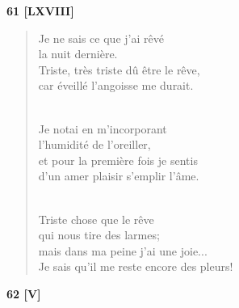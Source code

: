 \documentclass[a4paper,11pt]{book}
\begin{document}
\bigskip

\begin{center} {\bf 61 [LXVIII]} \end{center}

\begin{verse}
Je ne sais ce que j'ai rêvé \\
la nuit dernière. \\
Triste, très triste dû être le rêve, \\
car éveillé l'angoisse me durait. \\ \


Je notai en m'incorporant \\
l'humidité de l'oreiller, \\
et pour la première fois je sentis \\
d'un amer plaisir s'emplir l'âme. \\ \

Triste chose que le rêve \\
qui nous tire des larmes; \\
mais dans ma peine j'ai une joie... \\
Je sais qu'il me reste encore des pleurs! \\
\end{verse}

\bigskip

\begin{center} {\bf 62 [V]} \end{center}
\end{document}
